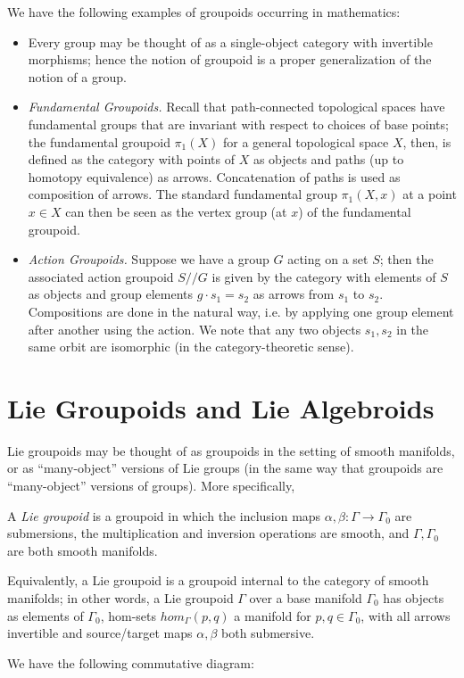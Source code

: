 We have the following examples of groupoids occurring in mathematics:
\begin{itemize}
\item Every group may be thought of as a single-object category with invertible morphisms; hence the notion of groupoid is a proper generalization of the notion of a group.

\item \emph{Fundamental Groupoids.} Recall that path-connected topological spaces have fundamental groups that are invariant with respect to choices of base points; the fundamental groupoid $\pi_1(X)$ for a general topological space $X$, then, is defined as the category with points of $X$ as objects and paths (up to homotopy equivalence) as arrows. Concatenation of paths is used as composition of arrows. The standard fundamental group $\pi_1(X,x)$ at a point $x \in X$ can then be seen as the vertex group (at $x$) of the fundamental groupoid.

\item \emph{Action Groupoids.} Suppose we have a group $G$ acting on a set $S$; then the associated action groupoid $S//G$ is given by the category with elements of $S$ as objects and group elements $g \cdot s_1 = s_2$ as arrows from $s_1$ to $s_2$. Compositions are done in the natural way, i.e. by applying one group element after another using the action. We note that any two objects $s_1,s_2$ in the same orbit are isomorphic (in the category-theoretic sense).
\end{itemize}

\section{Lie Groupoids and Lie Algebroids}
Lie groupoids may be thought of as groupoids in the setting of smooth manifolds, or as ``many-object'' versions of Lie groups (in the same way that groupoids are ``many-object'' versions of groups). More specifically,

\begin{defn}
A \emph{Lie groupoid} is a groupoid in which the inclusion maps $\alpha, \beta : \Gamma \to \Gamma_0$ are submersions, the multiplication and inversion operations are smooth, and $\Gamma, \Gamma_0$ are both smooth manifolds.

Equivalently, a Lie groupoid is a groupoid internal to the category of smooth manifolds; in other words, a Lie groupoid $\Gamma$ over a base manifold $\Gamma_0$ has objects as elements of $\Gamma_0$, hom-sets $hom_\Gamma(p,q)$ a manifold for $p,q \in \Gamma_0$, with all arrows invertible and source/target maps $\alpha,\beta$ both submersive.

We have the following commutative diagram:

\end{defn}

